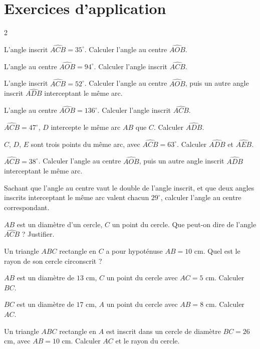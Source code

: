 \section{Exercices d'application}
\begin{multicols}{2}

\exo{} L'angle inscrit $\widehat{ACB}=35^{\circ}$. Calculer l'angle au centre
$\widehat{AOB}$.

\exo{} L'angle au centre $\widehat{AOB}=94^{\circ}$. Calculer l'angle inscrit
$\widehat{ACB}$.

\exo{} L'angle inscrit $\widehat{ACB}=52^{\circ}$. Calculer l'angle au centre
$\widehat{AOB}$, puis un autre angle inscrit $\widehat{ADB}$ interceptant le même arc.

\exo{} L'angle au centre $\widehat{AOB}=136^{\circ}$. Calculer l'angle inscrit
$\widehat{ACB}$.

\exo{} $\widehat{ACB}=47^{\circ}$, $D$ intercepte le même arc $AB$ que $C$.
Calculer $\widehat{ADB}$.

\exo{} $C$, $D$, $E$ sont trois points du même arc, avec $\widehat{ACB}=63^{\circ}$.
Calculer $\widehat{ADB}$ et $\widehat{AEB}$.

\exo{} $\widehat{ACB}=38^{\circ}$. Calculer l'angle au centre $\widehat{AOB}$, puis
un autre angle inscrit $\widehat{ADB}$ interceptant le même arc.

\exo{} Sachant que l'angle au centre vaut le double de l'angle inscrit, et que deux
angles inscrits interceptant le même arc valent chacun $29^{\circ}$, calculer l'angle au
centre correspondant.

\exo{} $AB$ est un diamètre d'un cercle, $C$ un point du cercle. Que peut-on dire
de l'angle $\widehat{ACB}$ ? Justifier.

\exo{} Un triangle $ABC$ rectangle en $C$ a pour hypoténuse $AB=10$ cm. Quel est le
rayon de son cercle circonscrit ?

\exo{} $AB$ est un diamètre de $13$ cm, $C$ un point du cercle avec $AC=5$ cm.
Calculer $BC$.

\exo{} $BC$ est un diamètre de $17$ cm, $A$ un point du cercle avec $AB=8$ cm.
Calculer $AC$.

\exo{} Un triangle $ABC$ rectangle en $A$ est inscrit dans un cercle de diamètre
$BC=26$ cm, avec $AB=10$ cm. Calculer $AC$ et le rayon du cercle.


\end{multicols}
